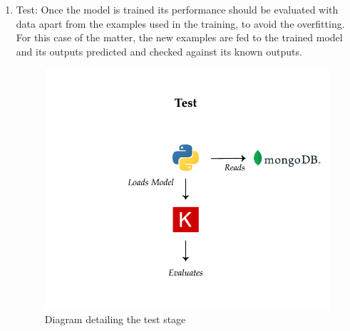 \begin{itemize}
\begin{enumerate}
        \item Test: Once the model is trained its performance should be evaluated with data apart from the examples used in the training, to avoid the overfitting. For this case of the matter, the new examples are fed to the trained model and its outputs predicted and checked against its known outputs.
        \begin{figure}[th]
            \centering
            \includegraphics{Figures/TestStage}
            \decoRule
            \caption[Test Stage]{Diagram detailing the test stage}
            \label{fig:Test Stage}
        \end{figure}
        

\end{enumerate}
\end{itemize}
